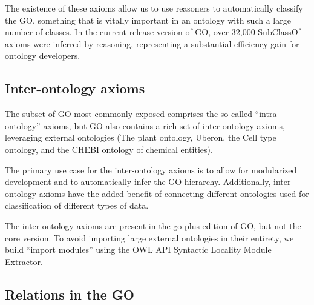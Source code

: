 \documentclass{llncs}
\begin{document}
The existence of these axioms allow us to use reasoners to
automatically classify the GO, something that is vitally important in
an ontology with such a large number of classes. In the current
release version of GO, over 32,000 SubClassOf axioms were inferred by
reasoning, representing a substantial efficiency gain for ontology
developers.




\subsection{Inter-ontology axioms}

The subset of GO most commonly exposed comprises the so-called
``intra-ontology'' axioms, but GO also contains a rich set of
inter-ontology axioms, leveraging external ontologies (The plant
ontology, Uberon, the Cell type ontology, and the CHEBI ontology of
chemical entities).

The primary use case for the inter-ontology axioms is to allow for
modularized development and to automatically infer the GO
hierarchy. Additionally, inter-ontology axioms have the added benefit
of connecting different ontologies used for classification of
different types of data.

The inter-ontology axioms are present in the go-plus edition of GO,
but not the core version. To avoid importing large external ontologies
in their entirety, we build ``import modules'' using the OWL API
Syntactic Locality Module Extractor.

\subsection{Relations in the GO}
\end{document}
